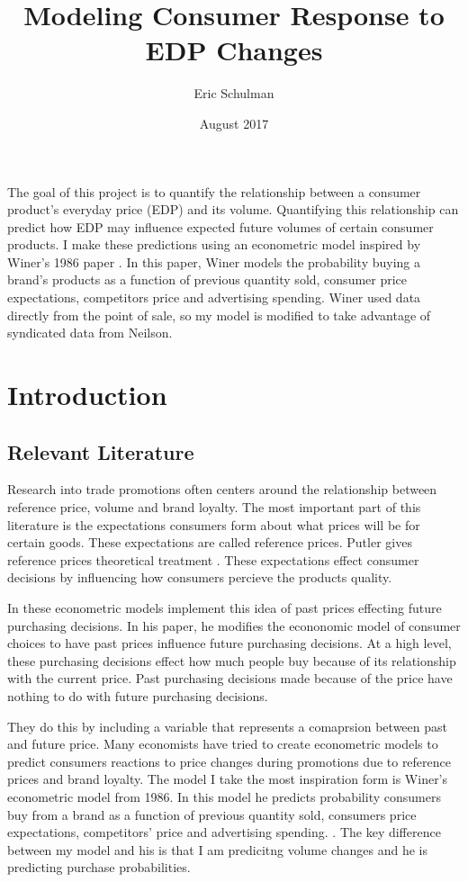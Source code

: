 \documentclass{article}
\title{Modeling Consumer Response to EDP Changes}
\author{Eric Schulman}
\date{August 2017}
\begin{document}
\maketitle

The goal of this project is to quantify the relationship between a consumer product's everyday price (EDP) and its volume. Quantifying this relationship can predict how EDP may influence expected future volumes of certain consumer products. I make these predictions using an econometric model inspired by Winer's 1986 paper \cite{winer}. In this paper, Winer models the probability buying a brand's products as a function of previous quantity sold, consumer price expectations, competitors price and advertising spending. Winer used data directly from the point of sale, so my model is modified to take advantage of syndicated data from Neilson.

\section{Introduction}

\subsection{Relevant Literature}

Research into trade promotions often centers around the relationship between reference price, volume and brand loyalty. The most important part of this literature is the expectations consumers form about what prices will be for certain goods. These expectations are called reference prices. Putler gives reference prices theoretical treatment \cite{putler}. These expectations effect consumer decisions by influencing how consumers percieve the products quality.

In these econometric models implement this idea of past prices effecting future purchasing decisions. In his paper, he modifies the econonomic model of consumer choices to have past prices influence future purchasing decisions. At a high level, these purchasing decisions effect how much people buy because of its relationship with the current price. Past purchasing decisions made because of the price have nothing to do with future purchasing decisions.

 They do this by including a variable that represents a comaprsion between past and future price. Many economists have tried to create econometric models to predict consumers reactions to price changes during promotions due to reference prices and brand loyalty. The model I take the most inspiration form is Winer's econometric model from 1986. In this model he predicts probability consumers buy from a brand as a function of previous quantity sold, consumers price expectations, competitors' price and advertising spending.  \cite{winer}. The key difference between my model and his is that I am predicitng volume changes and he is predicting purchase probabilities.
\end{document}
